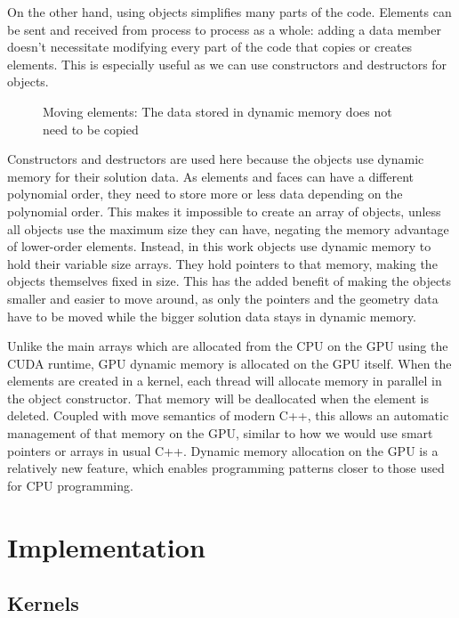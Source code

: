 On the other hand, using objects simplifies many parts of the code. Elements can be sent and
received from process to process as a whole: adding a data member doesn't necessitate modifying
every part of the code that copies or creates elements. This is especially useful as we can use
constructors and destructors for objects.

\begin{figure}[H]
	\centering
	
	\caption{Moving elements: The data stored in dynamic memory does not need to be copied}
	\label{fig:moving_elements}
\end{figure}

Constructors and destructors are used here because the objects use dynamic memory for their solution
data. As elements and faces can have a different polynomial order, they need to store more or less
data depending on the polynomial order. This makes it impossible to create an array of objects,
unless all objects use the maximum size they can have, negating the memory advantage of lower-order
elements. Instead, in this work objects use dynamic memory to hold their variable size arrays. They
hold pointers to that memory, making the objects themselves fixed in size. This has the added
benefit of making the objects smaller and easier to move around, as only the pointers and the
geometry data have to be moved while the bigger solution data stays in dynamic memory. 

Unlike the main arrays which are allocated from the CPU on the GPU using the CUDA runtime, GPU
dynamic memory is allocated on the GPU itself. When the elements are created in a kernel, each
thread will allocate memory in parallel in the object constructor. That memory will be deallocated
when the element is deleted. Coupled with move semantics of modern C++, this allows an automatic
management of that memory on the GPU, similar to how we would use smart pointers or arrays in usual
C++. Dynamic memory allocation on the GPU is a relatively new feature, which enables programming
patterns closer to those used for CPU programming.

\section{Implementation} \label{section:graphics_processing_units:implementation}

\subsection{Kernels} \label{subsection:graphics_processing_units:implementation:kernels}

